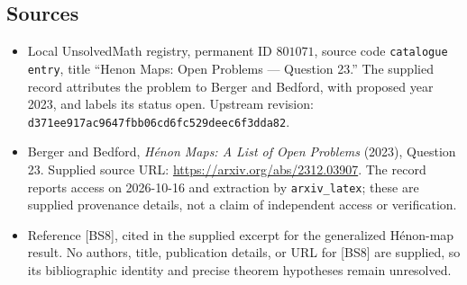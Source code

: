 \documentclass[11pt]{article}
\begin{document}
\subsection{Sources}
\begin{itemize}
\item Local UnsolvedMath registry, permanent ID \(801071\), source code \texttt{catalogue entry}, title ``Henon Maps: Open Problems --- Question 23.'' The supplied record attributes the problem to Berger and Bedford, with proposed year 2023, and labels its status open. Upstream revision: \texttt{d371ee917ac9647fbb06cd6fc529deec6f3dda82}.
\item Berger and Bedford, \emph{H\'enon Maps: A List of Open Problems} (2023), Question 23. Supplied source URL: \url{https://arxiv.org/abs/2312.03907}. The record reports access on 2026-10-16 and extraction by \texttt{arxiv\_latex}; these are supplied provenance details, not a claim of independent access or verification.
\item Reference [BS8], cited in the supplied excerpt for the generalized H\'enon-map result. No authors, title, publication details, or URL for [BS8] are supplied, so its bibliographic identity and precise theorem hypotheses remain unresolved.
\end{itemize}
\end{document}
